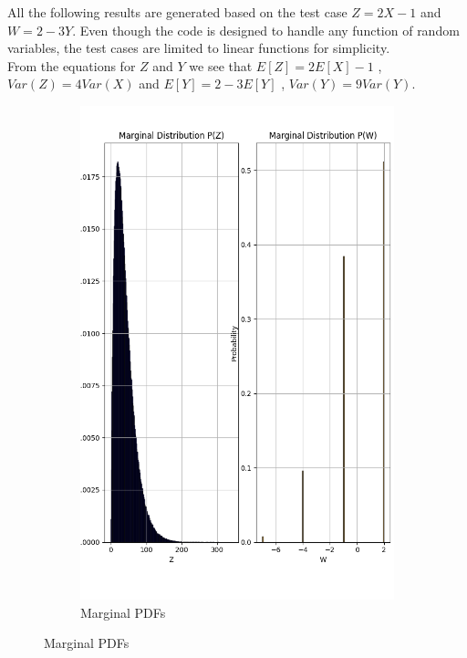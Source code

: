 \documentclass{article}
\begin{document}
All the following results are generated based on the test case \( Z=2X-1 \) and \( W=2-3Y \). Even though the code is designed to handle any function of random variables, the test cases are limited to linear functions for simplicity.\\
From the equations for $Z$ and $Y$ we see that $E[Z] = 2 E[X] - 1$ , $Var(Z) = 4 Var(X)$ and $E[Y] = 2 - 3 E[Y]$ , $Var(Y) = 9 Var(Y)$.

\begin{figure}[H]
  \centering
  \begin{subfigure}{0.45\textwidth}
    \centering
    \includegraphics[width=\linewidth]{results/section3/a(1).png}
    \caption{Marginal PDFs}
  \end{subfigure}

\end{figure}
\end{document}
